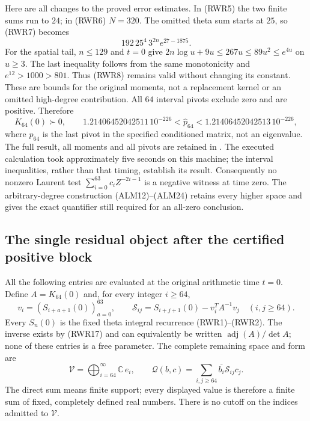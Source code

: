 Here are all changes to the proved error estimates. In (RWR5) the two
finite sums run to $24$; in (RWR6) $N=320$. The omitted theta sum
starts at $25$, so (RWR7) becomes
\[
 192\,25^4\,3^{2n}e^{27-1875}.
\]
For the spatial tail, $n\le129$ and $t=0$ give
$2n\log u+9u\le267u\le89u^2\le e^{4u}$ on $u\ge3$.
The last inequality follows from the same monotonicity and
$e^{12}>1000>801$. Thus (RWR8) remains valid without changing its
constant. These are bounds for the original moments, not a
replacement kernel or an omitted high-degree contribution.
All $64$ interval pivots exclude zero and are positive. Therefore
\begin{equation}\tag{RWR17}
 K_{64}(0)\succ0,\qquad
 1.21406452042511\,10^{-226}
 <\widehat p_{64}<1.21406452042513\,10^{-226},
\end{equation}
where $\widehat p_{64}$ is the last pivot in the specified conditioned
matrix, not an eigenvalue. The full result, all moments and all pivots
are retained in . The executed
calculation took approximately five seconds on this machine; the
interval inequalities, rather than that timing, establish its result.
Consequently no nonzero Laurent test
$\sum_{i=0}^{63}c_iZ^{-2i-1}$ is a negative witness at time zero.
The arbitrary-degree construction (ALM12)--(ALM24) retains every
higher space and gives the exact quantifier still required for an
all-zero conclusion.

\subsection{The single residual object after the certified positive block}
All the following entries are evaluated at the original arithmetic time
$t=0$. Define $A=K_{64}(0)$ and, for every integer $i\ge64$,
\begin{equation}\tag{RWR18}
 v_i=(S_{i+a+1}(0))_{a=0}^{63},\qquad
 \mathscr S_{ij}=S_{i+j+1}(0)-v_i^TA^{-1}v_j\quad(i,j\ge64).
\end{equation}
Every $S_n(0)$ is the fixed theta integral recurrence (RWR1)--(RWR2).
The inverse exists by (RWR17) and can equivalently be written
$\operatorname{adj}(A)/\det A$; none of these entries is a free
parameter. The complete remaining space and form are
\begin{equation}\tag{RWR19}
 \mathscr V=\bigoplus_{i=64}^{\infty}\mathbb C\,e_i,
 \qquad \mathscr Q(b,c)=\sum_{i,j\ge64}\overline{b_i}\mathscr S_{ij}c_j.
\end{equation}
The direct sum means finite support; every displayed value is therefore
a finite sum of fixed, completely defined real numbers. There is no
cutoff on the indices admitted to $\mathscr V$.

